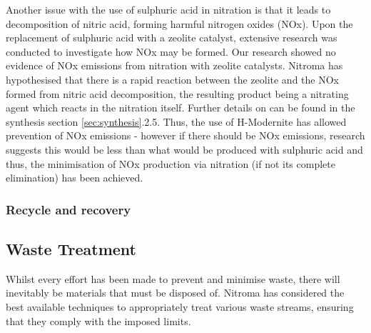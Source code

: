 Another issue with the use of sulphuric acid in nitration is that it leads to decomposition of nitric acid, forming harmful nitrogen oxides (NOx). Upon the replacement of sulphuric acid with a zeolite catalyst, extensive research was conducted to investigate how NOx may be formed. Our research showed no evidence of NOx emissions from nitration with zeolite catalysts. Nitroma has hypothesised that there is a rapid reaction between the zeolite and the NOx formed from nitric acid decomposition, the resulting product being a nitrating agent which reacts in the nitration itself. Further details on can be found in the synthesis section \ref{sec:synthesis}.2.5. Thus, the use of H-Modernite has allowed prevention of NOx emissions - however if there should be NOx emissions, research suggests this would be less than what would be produced with sulphuric acid and thus, the minimisation of NOx production via nitration (if not its complete elimination) has been achieved.  

\subsubsection{Recycle and recovery}


 






\subsection{Waste Treatment}

Whilst every effort has been made to prevent and minimise waste, there will inevitably be materials that must be disposed of. Nitroma has considered the best available techniques to appropriately treat various waste streams, ensuring that they comply with the imposed limits.  



